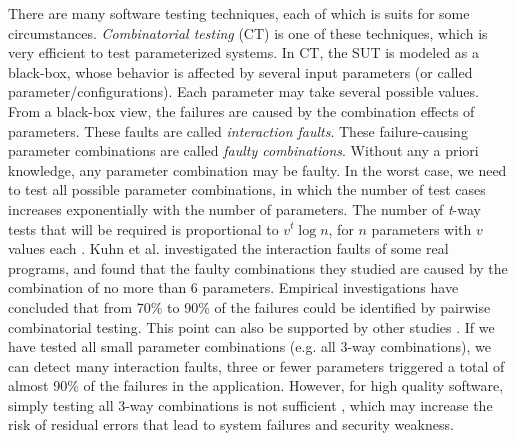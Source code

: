 \documentclass[10pt,conference, compsocconf]{IEEEtran}
\begin{document}
\begin{CJK}{UTF8}{gkai}
There are many software testing techniques, each of which is suits for some
circumstances. \emph{Combinatorial testing} (CT) is one of these techniques,
which is very efficient to test parameterized systems.
In CT, the SUT is modeled as a black-box,
whose behavior is affected by several input parameters (or
called parameter/configurations).
Each parameter may take several possible values.
From a black-box view, the failures are caused by the combination
effects of parameters.
These faults are called \emph{interaction faults}.
These failure-causing parameter combinations are called \emph{faulty combinations}.
Without any a priori knowledge, any parameter combination may
be faulty.
In the worst case, we need to test all possible parameter combinations,
in which the number of test cases increases exponentially with the
number of parameters.
The number of \emph{t}-way tests that will be required is proportional to
 $v^t \log n$, 
for $n$ parameters with $v$ values each
\cite{Kuhn2010NIST,Cohen1997TSE}. 
Kuhn et al. \cite{kuhn02SEW,kuhn04TSE,Hagar2015computer} investigated the interaction faults of
some real programs, and found that the faulty combinations they studied are caused by 
the combination of no more than 6 parameters.
Empirical investigations have concluded that from 70\% to 90\% of the failures
could be identified by pairwise combinatorial testing\cite{kuhn04TSE}.
This point can also be supported by other studies \cite{zhang11ISSTA,vilkomir13ICSTW}.
If we have tested all small parameter combinations (e.g. all 3-way combinations),
we can detect many interaction faults,
three or fewer parameters triggered a total of almost 90\% of the 
failures in the application\cite{Hagar2015computer}.
However, for high quality software,
simply testing all 3-way combinations is not sufficient \cite{kuhn02SEW},
which may increase the risk of residual errors that lead to system failures and 
security weakness\cite{Kuhn2010NIST}. 


\end{CJK}
\end{document}
